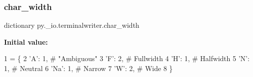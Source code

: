 \subsubsection{\texorpdfstring{char\+\_\+width}{char\_width}}
{\footnotesize\ttfamily dictionary py.\+\_\+io.\+terminalwriter.\+char\+\_\+width}

{\bfseries Initial value\+:}
\begin{DoxyCode}
1 =  \{
2     \textcolor{stringliteral}{'A'}: 1,   \textcolor{comment}{# "Ambiguous"}
3     \textcolor{stringliteral}{'F'}: 2,   \textcolor{comment}{# Fullwidth}
4     \textcolor{stringliteral}{'H'}: 1,   \textcolor{comment}{# Halfwidth}
5     \textcolor{stringliteral}{'N'}: 1,   \textcolor{comment}{# Neutral}
6     \textcolor{stringliteral}{'Na'}: 1,  \textcolor{comment}{# Narrow}
7     \textcolor{stringliteral}{'W'}: 2,   \textcolor{comment}{# Wide}
8 \}
\end{DoxyCode}
